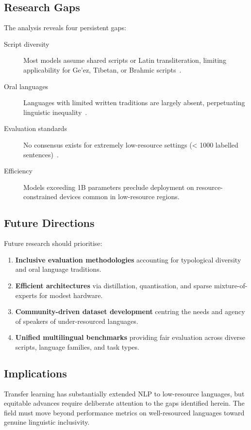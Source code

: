 \documentclass[
    language=english,
    doctype=article,
    institution=none,
    titlestyle=book,
]{../../omnilatex}
\begin{document}
\subsection{Research Gaps}
The analysis reveals four persistent gaps:
\begin{description}
    \item[Script diversity] Most models assume shared scripts or Latin
    transliteration, limiting applicability for Ge'ez, Tibetan, or Brahmic
    scripts~\cite{lauscher2020length}.
    \item[Oral languages] Languages with limited written traditions are largely
    absent, perpetuating linguistic
    inequality~\cite{bender2021stochastic}.
    \item[Evaluation standards] No consensus exists for extremely low-resource
    settings (< 1000 labelled sentences)~\cite{geiger2024evaluating}.
    \item[Efficiency] Models exceeding 1B parameters preclude deployment on
    resource-constrained devices common in low-resource regions.
\end{description}

\subsection{Future Directions}
Future research should prioritise:
\begin{enumerate}
    \item \textbf{Inclusive evaluation methodologies} accounting for
    typological diversity and oral language traditions.
    \item \textbf{Efficient architectures} via distillation, quantisation, and
    sparse mixture-of-experts for modest hardware.
    \item \textbf{Community-driven dataset development} centring the needs and
    agency of speakers of under-resourced languages.
    \item \textbf{Unified multilingual benchmarks} providing fair evaluation
    across diverse scripts, language families, and task types.
\end{enumerate}

\subsection{Implications}
Transfer learning has substantially extended NLP to low-resource languages, but
equitable advances require deliberate attention to the gaps identified herein.
The field must move beyond performance metrics on well-resourced languages toward
genuine linguistic inclusivity.

\printbibliography
\end{document}
